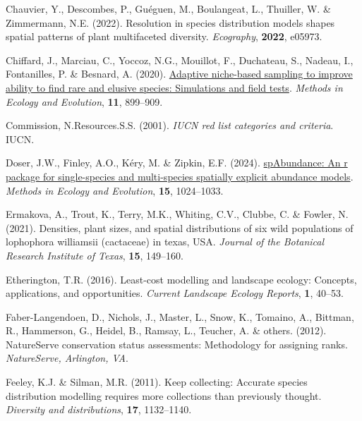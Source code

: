 \documentclass[
]{article}
\newlength{\cslhangindent}
\newlength{\cslentryspacingunit} %
\newenvironment{CSLReferences}[2] %
 {%
  \setlength{\parindent}{0pt}
  \ifodd #1
  \let\oldpar\par
  \def\par{\hangindent=\cslhangindent\oldpar}
  \fi
  \setlength{\parskip}{#2\cslentryspacingunit}
 }%
 {}
\begin{document}
\begin{CSLReferences}{1}{0}
\leavevmode{}%
Chauvier, Y., Descombes, P., Guéguen, M., Boulangeat, L., Thuiller, W.
\& Zimmermann, N.E. (2022). Resolution in species distribution models
shapes spatial patterns of plant multifaceted diversity.
\emph{Ecography}, \textbf{2022}, e05973.

\leavevmode{}%
Chiffard, J., Marciau, C., Yoccoz, N.G., Mouillot, F., Duchateau, S.,
Nadeau, I., Fontanilles, P. \& Besnard, A. (2020).
\href{https://doi.org/10.1111/2041-210X.13399}{Adaptive niche-based
sampling to improve ability to find rare and elusive species:
Simulations and field tests}. \emph{Methods in Ecology and Evolution},
\textbf{11}, 899--909.

\leavevmode{}%
Commission, N.Resources.S.S. (2001). \emph{IUCN red list categories and
criteria}. IUCN.

\leavevmode{}%
Doser, J.W., Finley, A.O., Kéry, M. \& Zipkin, E.F. (2024).
\href{https://doi.org/10.1111/2041-210X.14332}{spAbundance: An r package
for single-species and multi-species spatially explicit abundance
models}. \emph{Methods in Ecology and Evolution}, \textbf{15},
1024--1033.

\leavevmode{}%
Ermakova, A., Trout, K., Terry, M.K., Whiting, C.V., Clubbe, C. \&
Fowler, N. (2021). Densities, plant sizes, and spatial distributions of
six wild populations of lophophora williamsii (cactaceae) in texas, USA.
\emph{Journal of the Botanical Research Institute of Texas},
\textbf{15}, 149--160.

\leavevmode{}%
Etherington, T.R. (2016). Least-cost modelling and landscape ecology:
Concepts, applications, and opportunities. \emph{Current Landscape
Ecology Reports}, \textbf{1}, 40--53.

\leavevmode{}%
Faber-Langendoen, D., Nichols, J., Master, L., Snow, K., Tomaino, A.,
Bittman, R., Hammerson, G., Heidel, B., Ramsay, L., Teucher, A. \&
others. (2012). NatureServe conservation status assessments: Methodology
for assigning ranks. \emph{NatureServe, Arlington, VA}.

\leavevmode{}%
Feeley, K.J. \& Silman, M.R. (2011). Keep collecting: Accurate species
distribution modelling requires more collections than previously
thought. \emph{Diversity and distributions}, \textbf{17}, 1132--1140.


\end{CSLReferences}
\end{document}
